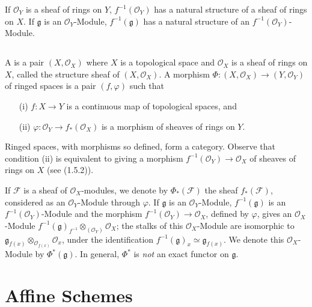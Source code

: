 If $\mathscr{O}_{Y}$ is a sheaf of rings on $Y$,
$f^{-1}(\mathscr{O}_{Y})$ has a natural structure of a sheaf of rings
on $X$. If $\mathfrak{g}$ is an $\mathscr{O}_{Y}$-Module,
$f^{-1}(\mathfrak{g})$ has a natural structure of an
$f^{-1}(\mathscr{O}_{Y})$-Module. 

\subsection{}\label{chap1-sec1.5.3}%

A is a pair $(X,\mathscr{O}_{X})$
where $X$ is a topological space and $\mathscr{O}_{X}$ is a sheaf of
rings on $X$, called the structure sheaf of $(X,\mathscr{O}_{X})$. A
morphism $\Phi:(X,\mathscr{O}_{X})\to (Y,\mathscr{O}_{Y})$ of ringed
spaces is a pair $(f,\varphi)$ such that
\begin{itemize}
\item[(i)] $f:X\to Y$ is a continuous map of topological spaces, and

\item[(ii)] $\varphi:\mathscr{O}_{Y}\to f_{\ast}(\mathscr{O}_{X})$ is
  a morphism of sheaves of rings on $Y$.
\end{itemize}

Ringed spaces, with morphisms so defined, form a category. Observe
that condition (ii) is equivalent to giving a morphism
$f^{-1}(\mathscr{O}_{Y})\to \mathscr{O}_{X}$ of sheaves of rings on
$X$ (see (1.5.2)).

If $\mathscr{F}$ is a sheaf of $\mathscr{O}_{X}$-modules, we denote by
$\Phi_{\ast}(\mathscr{F})$ the sheaf $f_{\ast}(\mathscr{F})$,
considered as an $\mathscr{O}_{Y}$-Module through $\varphi$. If
$\mathfrak{g}$ is an $\mathscr{O}_{Y}$-Module, $f^{-1}(\mathfrak{g})$
is an $f^{-1}(\mathscr{O}_{Y})$-Module and the morphism
$f^{-1}(\mathscr{O}_{Y})\to \mathscr{O}_{X}$, defined by $\varphi$,
gives an $\mathscr{O}_{X}$-Module
$f^{-1}(\mathfrak{g})_{f^{-1}}\otimes_{(\mathscr{O}_{Y})}\mathscr{O}_{X}$;
the stalks of this $\mathscr{O}_{X}$-Module are isomorphic to
$\mathfrak{g}_{f(x)}\otimes_{\mathscr{O}_{f(x)}}\mathscr{O}_{x}$,
under the identification $f^{-1}(\mathfrak{g})_{x}\simeq
\mathfrak{g}_{f(x)}$. We denote this $\mathscr{O}_{X}$-Module by
$\Phi^{\ast}(\mathfrak{g})$. In general, $\Phi^{\ast}$ is {\em not} an
exact functor on $\mathfrak{g}$. 

\section{Affine Schemes}\label{chap1-sec1.6}%

